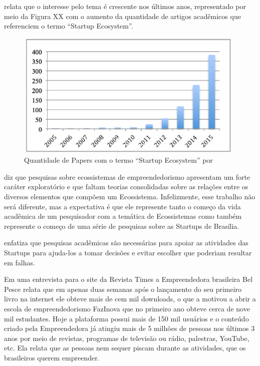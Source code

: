  relata que o interesse pelo tema é crescente nos últimos anos, representado por meio da Figura XX com o aumento da quantidade de artigos acadêmicos que referenciem o termo ``Startup Ecosystem''.

\begin{figure}[!htb]
\centering
\includegraphics[width=11cm,angle=0]{figuras/papers_about_startup_ecosystems}
\caption{Quantidade de Papers com o termo ``Startup Ecosystem'' por }
\label{figure:papers_about_startup_ecosystems}
\end{figure}

 diz que pesquisas sobre ecossistemas de empreendedorismo apresentam um forte caráter exploratório e que faltam teorias consolidadas sobre as relações entre os diversos elementos que compõem um Ecossistema. Infelizmente, esse trabalho não será diferente, mas a expectativa é que ele represente tanto o começo da vida acadêmica de um pesquisador com a temática de Ecossistemas como também represente o começo de uma série de pesquisas sobre as Startups de Brasília. 

 enfatiza que pesquisas acadêmicas são necessárias para apoiar as atividades das Startups para ajuda-los a tomar decisões e evitar escolher que poderiam resultar em falhas.

Em uma entrevista para o site da Revista Times a Empreendedora brasileira Bel Pesce relata que em apenas duas semanas após o lançamento do seu primeiro livro na internet ele obteve mais de cem mil downloads, o que a motivou a abrir a escola de empreendedorismo FazInova que no primeiro ano obteve cerca de nove mil estudantes. Hoje a plataforma possui mais de 150 mil usuários e o conteúdo criado pela Empreendedora já atingiu mais de 5 milhões de pessoas nos últimos 3 anos por meio de revistas, programas de televisão ou rádio, palestras, YouTube, etc. Ela relata que as pessoas nem sequer piscam durante as atividades, que os brasileiros querem empreender.

